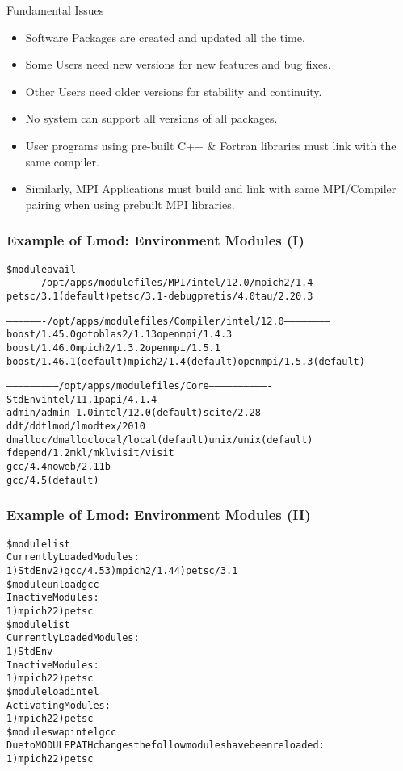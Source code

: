\documentclass[dvipsnames,aspectratio=169]{beamer}
\begin{document}
\begin{frame}{Fundamental Issues}
  \begin{itemize}
    \item Software Packages are created and updated all the time.
    \item Some Users need new versions for new features and bug fixes.
    \item Other Users need older versions for stability and continuity.
    \item No system can support all versions of all packages.
    \item User programs using pre-built C++ \& Fortran libraries must
      link with the same compiler.
    \item Similarly, MPI Applications must build and link with same
      MPI/Compiler pairing when using prebuilt MPI libraries.
  \end{itemize}
\end{frame}

\begin{frame}[fragile]
    \frametitle{Example of Lmod: Environment Modules (I)}
    {\tiny
\begin{alltt}
\$ {\color{blue} module avail}
------------------ /opt/apps/modulefiles/MPI/intel/12.0/mpich2/1.4 ------------------
  petsc/3.1 (default)    petsc/3.1-debug    pmetis/4.0    tau/2.20.3

------------------- /opt/apps/modulefiles/Compiler/intel/12.0 -----------------------
  boost/1.45.0              gotoblas2/1.13          openmpi/1.4.3
  boost/1.46.0              mpich2/1.3.2            openmpi/1.5.1
  boost/1.46.1 (default)    mpich2/1.4 (default)    openmpi/1.5.3 (default)

-------------------------- /opt/apps/modulefiles/Core -------------------------------
  StdEnv               intel/11.1               papi/4.1.4
  admin/admin-1.0      intel/12.0 (default)     scite/2.28
  ddt/ddt              lmod/lmod                tex/2010
  dmalloc/dmalloc      local/local (default)    unix/unix (default)
  fdepend/1.2          mkl/mkl                  visit/visit
  gcc/4.4              noweb/2.11b
  gcc/4.5 (default)
\end{alltt}
    }
\end{frame}

\begin{frame}[fragile]
    \frametitle{Example of Lmod: Environment Modules (II)}
    {\tiny
\begin{alltt}
{\color{blue}\$ module list}
Currently Loaded Modules:
  1) StdEnv  2) gcc/4.5  3) mpich2/1.4  4) petsc/3.1
{\color{blue}\$ module unload gcc}
Inactive Modules:
  1) mpich2  2) petsc
{\color{blue}\$ module list}
Currently Loaded Modules:
  1) StdEnv
Inactive Modules:
  1) mpich2  2) petsc
{\color{blue}\$ module load intel}
Activating Modules:
  1) mpich2  2) petsc
{\color{blue}\$ module swap intel gcc}
Due to MODULEPATH changes the follow modules have been reloaded:
  1) mpich2  2) petsc
\end{alltt}
    }
\end{frame}
\end{document}
